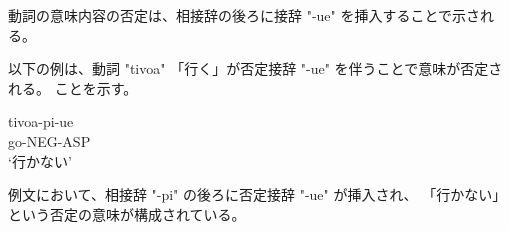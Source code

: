 動詞の意味内容の否定は、相接辞の後ろに接辞 "-ue" を挿入することで示される。

以下の例は、動詞 "tivoa" 「行く」が否定接辞 "-ue" を伴うことで意味が否定される。
ことを示す。

\begin{exe}
\ex \gll tivoa-pi-ue \\
        go-NEG-ASP \\
        \glt `行かない'
\end{exe}
%
例文において、相接辞 "-pi" の後ろに否定接辞 "-ue" が挿入され、
「行かない」という否定の意味が構成されている。